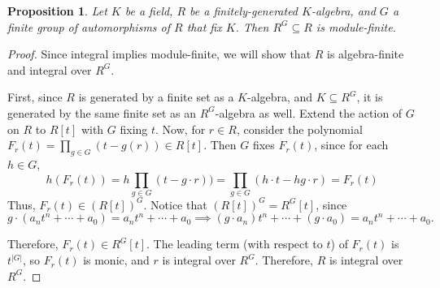 \documentclass{amsart}[12pt]
\numberwithin{equation}{section}
\theoremstyle{plain} %
\newtheorem{proposition}[equation]{Proposition}
\theoremstyle{definition}
\newtheorem{example}[equation]{Example}
\theoremstyle{remark}
\begin{document}
%	





\begin{proposition}
Let $K$ be a field, $R$ be a finitely-generated $K$-algebra, and $G$ a finite group of automorphisms of $R$ that fix $K$. Then $R^G \subseteq R$ is module-finite.
\end{proposition}

\begin{proof} 
Since integral implies module-finite, we will show that $R$ is algebra-finite and integral over $R^G$.

First, since $R$ is generated by a finite set as a $K$-algebra, and $K\subseteq R^G$, it is generated by the same finite set as an $R^G$-algebra as well. Extend the action of $G$ on $R$ to $R[t]$ with $G$ fixing $t$. Now, for $r\in R$, consider the polynomial $F_r(t)=\prod_{g\in G} (t-g(r)) \in R[t]$. Then $G$ fixes $F_r(t)$, since for each $h \in G$,
\[h(F_r(t)) = h \prod_{g\in G} (t-g \cdot r)) = \prod_{g\in G} (h \cdot t-hg \cdot r) = F_r(t)\]
Thus, $F_r(t)\in (R[t])^{G}$. Notice that $(R[t])^G = R^G[t]$, since 
\[ g \cdot (a_nt^n + \cdots + a_0) = a_n t^n + \cdots + a_0 \implies (g \cdot a_n)t^n + \cdots + (g \cdot a_0) = a_n t^n + \cdots + a_0.\]

Therefore, $F_r(t) \in R^G[t]$. The leading term (with respect to $t$) of $F_r(t)$ is $t^{|G|}$, so $F_r(t)$ is monic, and $r$ is integral over $R^G$. Therefore, $R$ is integral over $R^G$.
\end{proof}
\end{document}
